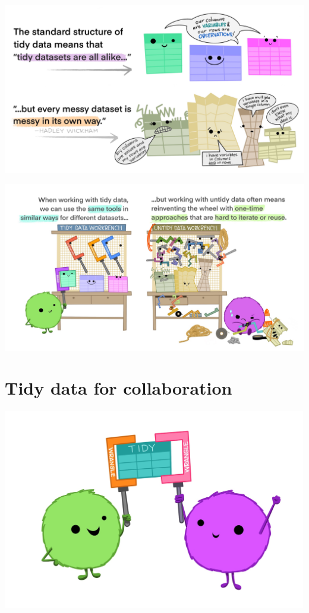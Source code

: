 \documentclass[
]{book}
\begin{document}
\includegraphics[width=6.26042in,height=\textheight]{images/tidydata_2.jpg}

\includegraphics{images/tidydata_3.jpg}

\hypertarget{tidy-data-for-collaboration}{%
\section{Tidy data for collaboration}\label{tidy-data-for-collaboration}}

\includegraphics[width=5.22917in,height=\textheight]{images/tidydata_4.jpg}
\end{document}
